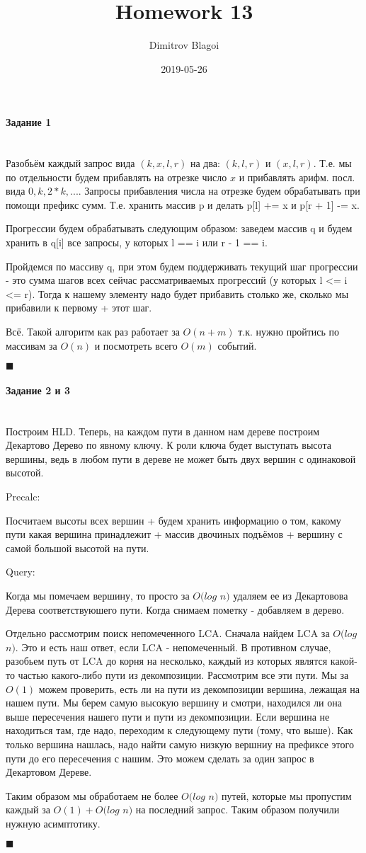 \documentclass{article}
\title{Homework 13}
\date{2019-05-26}
\author{Dimitrov Blagoi}
\newcommand{\myparagraph}[1]{\paragraph{#1}\mbox{}\\}
\begin{document}
  \maketitle
  \newpage

  \newpage

  \myparagraph{Задание 1}
  Разобьём каждый запрос вида $(k, x, l, r)$ на два: $(k, l, r)$ и $(x, l, r)$. Т.е. мы по отдельности будем прибавлять на отрезке число $x$ и прибавлять арифм. посл. вида $0, k, 2*k, ...$. Запросы прибавления числа на отрезке будем обрабатывать при помощи префикс сумм. Т.е. хранить массив p и делать p[l] += x и p[r + 1] -= x.

   Прогрессии будем обрабатывать следующим образом: заведем массив q и будем хранить в q[i] все запросы, у которых l == i или r - 1 == i.

   Пройдемся по массиву q, при этом будем поддерживать текущий шаг прогрессии - это сумма шагов всех сейчас рассматриваемых прогрессий (у которых l <= i <= r).
   Тогда к нашему элементу надо будет прибавить столько же, сколько мы прибавили к первому + этот шаг. 


   Всё. Такой алгоритм как раз работает за $O(n + m)$ т.к. нужно пройтись по массивам за $O(n)$ и посмотреть всего $O(m)$ событий.

  \begin{flushright}
    $\blacksquare$
  \end{flushright}

  \newpage

  \myparagraph{Задание 2 и 3}
  Построим HLD. Теперь, на каждом пути в данном нам дереве построим Декартово Дерево по явному ключу. К роли ключа будет выступать высота вершины, ведь в любом пути в дереве не может быть двух вершин с одинаковой высотой.

  Precalc:

  Посчитаем высоты всех вершин + будем хранить информацию о том, какому пути какая вершина принадлежит + массив двочиных подъёмов + вершину с самой большой высотой на пути.


  Query:

  Когда мы помечаем вершину, то просто за $O(log$ $n)$ удаляем ее из Декартовова Дерева соответствуюшего пути. Когда снимаем пометку - добавляем в дерево.

  Отдельно рассмотрим поиск непомеченного LCA. Сначала найдем LCA за $O(log$ $n)$. Это и есть наш ответ, если LCA - непомеченный. В противном случае, разобьем путь от LCA до корня на несколько, каждый из которых являтся какой-то частью какого-либо пути из декомпозиции. Рассмотрим все эти пути. Мы за $O(1)$ можем проверить, есть ли на пути из декомпозиции вершина, лежащая на нашем пути. Мы берем самую высокую вершину и смотри, находился ли она выше пересечения нашего пути и пути из декомпозиции. Если вершина не находиться там, где надо, переходим к следующему пути (тому, что выше). Как только вершина нашлась, надо найти самую низкую вершниу на префиксе этого пути до его пересечения с нашим. Это можем сделать за один запрос в Декартовом Дереве.

  Таким образом мы обработаем не более $O(log$ $n)$ путей, которые мы пропустим каждый за $O(1) + O(log$ $n)$ на последний запрос. Таким образом получили нужную асимптотику.

  \begin{flushright}
    $\blacksquare$
  \end{flushright}


 
\end{document}
